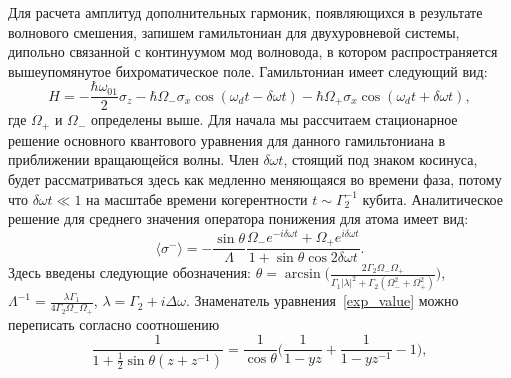 Для расчета амплитуд дополнительных гармоник, появляющихся в результате волнового смешения, запишем гамильтониан для двухуровневой системы, дипольно связанной с континуумом мод волновода, в котором распространяется вышеупомянутое бихроматическое поле. Гамильтониан имеет следующий вид:
\begin{equation}	
H = -\frac{\hbar \omega_{01}}{2}\sigma_z -\hbar \Omega_- \sigma_x \cos(\omega_d t - \delta\omega t) -\hbar \Omega_+ \sigma_x \cos(\omega_d t + \delta\omega t),	
\end{equation} 
где $\Omega_+$ и $\Omega_-$ определены выше. Для начала мы рассчитаем стационарное решение основного квантового уравнения для данного гамильтониана в приближении вращающейся волны. Член  $\delta\omega t$, стоящий под знаком косинуса, будет рассматриваться здесь как медленно меняющаяся во времени фаза, потому что  $\delta\omega t \ll 1$ на масштабе времени когерентности $t \sim \Gamma_2^{-1}$ кубита. Аналитическое решение для среднего значения оператора понижения для атома имеет вид:  
\begin{equation}
\langle \sigma^-\rangle = -\frac{\sin\theta}{\Lambda} \frac{\Omega_- e^{-i\delta\omega t} + \Omega_+ e^{i \delta\omega t}}{1 + \sin\theta\cos{2\delta\omega t}}. 
\label{exp_value}
\end{equation}
Здесь введены следующие обозначения: $\theta = \arcsin\Big(\frac{2\Gamma_2 \Omega_- \Omega_+}{\Gamma_1 |\lambda|^2 + \Gamma_2(\Omega_-^2 + \Omega_+^2)}\Big)$, $\Lambda^{-1} = \frac{\lambda\Gamma_1}{4\Gamma_2 \Omega_-\Omega_+}$, $\lambda = \Gamma_2 + i\Delta\omega$.
Знаменатель уравнения~\eqref{exp_value} можно переписать согласно соотношению  
\begin{equation}
\frac{1}{1+\frac{1}{2}\sin\theta(z + z^{-1})} = \frac{1}{\cos{\theta}}\Big(\frac{1}{1- yz} + \frac{1}{1- yz^{-1}}-1\Big), 
\label{exp_value2}
\end{equation}
